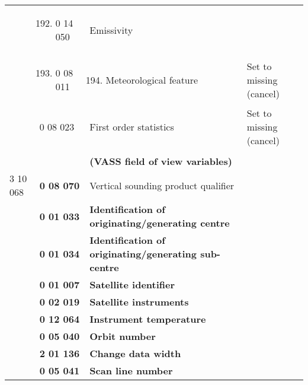 \begin{longtable}[]{@{}llll@{}}
\begin{minipage}[t]{0.22\columnwidth}
\end{minipage} & \begin{minipage}[t]{0.22\columnwidth}\raggedright
\begin{enumerate}
\setcounter{enumi}{191}
\item
  0 14 050
\end{enumerate}\strut
\end{minipage} & \begin{minipage}[t]{0.22\columnwidth}\raggedright
Emissivity\strut
\end{minipage} & \begin{minipage}[t]{0.22\columnwidth}\raggedright
\strut
\end{minipage}\tabularnewline
\begin{minipage}[t]{0.22\columnwidth}\raggedright
\strut
\end{minipage} & \begin{minipage}[t]{0.22\columnwidth}\raggedright
\begin{enumerate}
\setcounter{enumi}{192}
\item
  0 08 011
\end{enumerate}\strut
\end{minipage} & \begin{minipage}[t]{0.22\columnwidth}\raggedright
\begin{enumerate}
\setcounter{enumi}{193}
\item
  Meteorological feature
\end{enumerate}\strut
\end{minipage} & \begin{minipage}[t]{0.22\columnwidth}\raggedright
Set to missing (cancel)\strut
\end{minipage}\tabularnewline
& 0 08 023 & First order statistics & Set to missing (cancel)\tabularnewline
& & &\tabularnewline
& & \textbf{(VASS field of view variables)} &\tabularnewline
3 10 068 & \textbf{0 08 070} & Vertical sounding product qualifier &\tabularnewline
& \textbf{0 01 033} & \textbf{Identification of originating/generating centre} &\tabularnewline
& \textbf{0 01 034} & \textbf{Identification of originating/generating sub-centre} &\tabularnewline
& \textbf{0 01 007} & \textbf{Satellite identifier} &\tabularnewline
& \textbf{0 02 019} & \textbf{Satellite instruments} &\tabularnewline
& \textbf{0 12 064} & \textbf{Instrument temperature} &\tabularnewline
& \textbf{0 05 040} & \textbf{Orbit number} &\tabularnewline
& \textbf{2 01 136} & \textbf{Change data width} &\tabularnewline
& \textbf{0 05 041} & \textbf{Scan line number} &\tabularnewline

\end{longtable}
